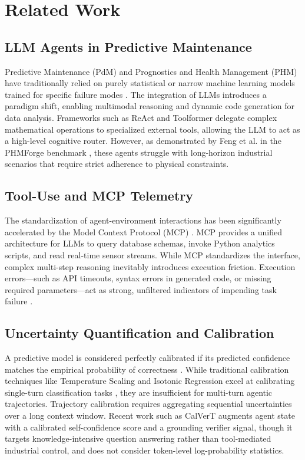 \documentclass[10pt,twocolumn,a4paper]{article}
\begin{document}
\section{Related Work}

\subsection{LLM Agents in Predictive Maintenance}
Predictive Maintenance (PdM) and Prognostics and Health Management (PHM) have traditionally relied on purely statistical or narrow machine learning models trained for specific failure modes \cite{zheng2017long}. The integration of LLMs introduces a paradigm shift, enabling multimodal reasoning and dynamic code generation for data analysis. Frameworks such as ReAct \cite{yao2022react} and Toolformer \cite{schick2023toolformer} delegate complex mathematical operations to specialized external tools, allowing the LLM to act as a high-level cognitive router. However, as demonstrated by Feng et al. in the PHMForge benchmark \cite{feng2026phmforge}, these agents struggle with long-horizon industrial scenarios that require strict adherence to physical constraints.

\subsection{Tool-Use and MCP Telemetry}
The standardization of agent-environment interactions has been significantly accelerated by the Model Context Protocol (MCP) \cite{anthropic2024mcp}. MCP provides a unified architecture for LLMs to query database schemas, invoke Python analytics scripts, and read real-time sensor streams. While MCP standardizes the interface, complex multi-step reasoning inevitably introduces execution friction. Execution errors—such as API timeouts, syntax errors in generated code, or missing required parameters—act as strong, unfiltered indicators of impending task failure \cite{mialon2023augmented}.

\subsection{Uncertainty Quantification and Calibration}
A predictive model is considered perfectly calibrated if its predicted confidence matches the empirical probability of correctness \cite{guo2017calibration}. While traditional calibration techniques like Temperature Scaling and Isotonic Regression excel at calibrating single-turn classification tasks \cite{zadrozny2002transforming}, they are insufficient for multi-turn agentic trajectories. Trajectory calibration requires aggregating sequential uncertainties over a long context window. Recent work such as CalVerT \cite{vinod2026calvert} augments agent state with a calibrated self-confidence score and a grounding verifier signal, though it targets knowledge-intensive question answering rather than tool-mediated industrial control, and does not consider token-level log-probability statistics.
\end{document}
